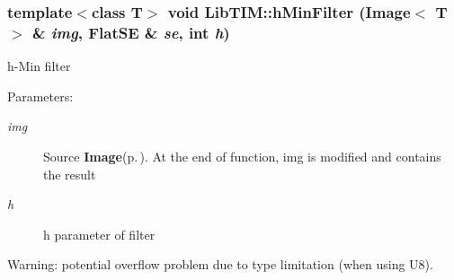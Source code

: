 \subsubsection{\setlength{\rightskip}{0pt plus 5cm}template$<$class T$>$ void Lib\-TIM::h\-Min\-Filter (Image$<$ T $>$ \& {\em img}, Flat\-SE \& {\em se}, int {\em h})}\label{group__connectedOperators_ga0}


h-Min filter 

\begin{Desc}
\item[Parameters:]
\begin{description}
\item[{\em img}]Source {\bf Image}{\rm (p.\,\pageref{classLibTIM_1_1Image})}. At the end of function, img is modified and contains the result \item[{\em h}]h parameter of filter\end{description}
\end{Desc}
Warning: potential overflow problem due to type limitation (when using U8).